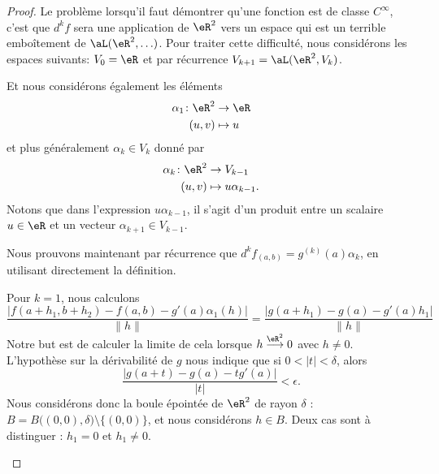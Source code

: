 \begin{proof}
	Le problème lorsqu'il faut démontrer qu'une fonction est de classe \(  C^{\infty}\), c'est que \( d^kf\) sera une application de \( \eR^2\) vers un espace qui est un terrible emboîtement de \( \aL(\eR^2,\ldots)\). Pour traiter cette difficulté, nous considérons les espaces suivants: \( V_0=\eR\) et par récurrence \( V_{k+1}=\aL(\eR^2,V_k)\).

	Et nous considérons également les éléments
	\begin{equation}
		\begin{aligned}
			\alpha_1\colon \eR^2 & \to \eR   \\
			(u,v)                & \mapsto u
		\end{aligned}
	\end{equation}
	et plus généralement \( \alpha_k\in V_k\) donné par
	\begin{equation}
		\begin{aligned}
			\alpha_k\colon \eR^2 & \to V_{k-1}            \\
			(u,v)                & \mapsto u\alpha_{k-1}.
		\end{aligned}
	\end{equation}
	Notons que dans l'expression \( u\alpha_{k-1}\), il s'agit d'un produit entre un scalaire \( u\in \eR\) et un vecteur \( \alpha_{k+1}\in V_{k-1}\).

	Nous prouvons maintenant par récurrence que \( d^{k}f_{(a,b)}=g^{(k)}(a)\alpha_k\), en utilisant directement la définition.

	\begin{subproof}
		\spitem[Initialisation]

		Pour \( k=1\), nous calculons
		\begin{equation}
			\frac{ |f(a+h_1,b+h_2)-f(a,b)-g'(a)\alpha_1(h)| }{ \| h \| }=\frac{ |g(a+h_1)-g(a)-g'(a)h_1| }{ \| h \| }
		\end{equation}
		Notre but est de calculer la limite de cela lorsque \( h\stackrel{\eR^2}{\longrightarrow}0\) avec \( h\neq 0\). L'hypothèse sur la dérivabilité de \( g\) nous indique que si \( 0<| t |<\delta\), alors
		\begin{equation}        \label{EQooQLWNooLRKhUv}
			\frac{ | g(a+t)-g(a)-tg'(a) | }{ | t | }<\epsilon.
		\end{equation}
		Nous considérons donc la boule épointée de \( \eR^2\) de rayon \( \delta\) : \( B=B\big( (0,0),\delta \big)\setminus\{(0,0)\}\), et nous considérons \( h\in B\). Deux cas sont à distinguer : \( h_1=0\) et \( h_1\neq 0\).


\end{subproof}
\end{proof}
